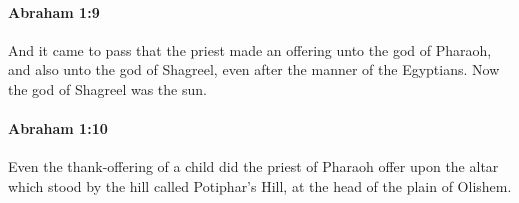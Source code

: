
		\paragraph{Abraham 1:9} %
			\label{ABRAHAM-1-9}

			And it came to pass that the priest made an offering unto the god of Pharaoh, and also unto the god of Shagreel, even after the manner of the Egyptians.  Now the god of Shagreel was the sun.


		\paragraph{Abraham 1:10} %
			\label{ABRAHAM-1-10}

			Even the thank-offering of a child did the priest of Pharaoh offer upon the altar which stood by the hill called Potiphar's Hill, at the head of the plain of Olishem.


